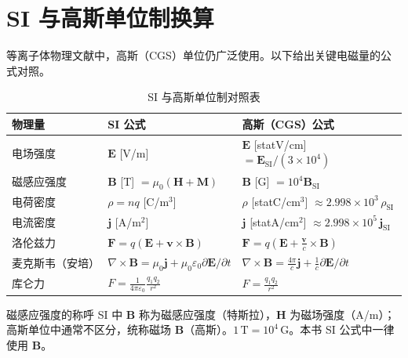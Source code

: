 \documentclass[12pt,a4paper,openany,oneside]{book}
\newcommand{\eps}{\varepsilon}
\newcommand{\vect}[1]{\bm{#1}}
\newcommand{\curl}{\nabla\times}
\begin{document}
\section{SI 与高斯单位制换算}

等离子体物理文献中，高斯（CGS）单位仍广泛使用。以下给出关键电磁量的公式对照。

\begin{table}[htbp]
\centering
\caption{SI 与高斯单位制对照表}
\label{tab:unit-conversion}
\begin{tabular}{@{}p{3.5cm}p{5.5cm}p{5.5cm}@{}}
\toprule
\textbf{物理量} & \textbf{SI 公式} & \textbf{高斯（CGS）公式} \\
\midrule
电场强度 & $\vect{E}$ [V/m] & $\vect{E}$ [statV/cm] $= \vect{E}_\text{SI}/(3\times 10^4)$ \\
磁感应强度 & $\vect{B}$ [T] $=\mu_0(\vect{H}+\vect{M})$ & $\vect{B}$ [G] $= 10^4\vect{B}_\text{SI}$ \\
电荷密度 & $\rho = nq$ [C/m$^3$] & $\rho$ [statC/cm$^3$] $\approx 2.998\times 10^{3}\,\rho_\text{SI}$ \\
电流密度 & $\vect{j}$ [A/m$^2$] & $\vect{j}$ [statA/cm$^2$] $\approx 2.998\times 10^{5}\,\vect{j}_\text{SI}$ \\
洛伦兹力 & $\vect{F}=q(\vect{E}+\vect{v}\times\vect{B})$ & $\vect{F}=q\left(\vect{E}+\frac{\vect{v}}{c}\times\vect{B}\right)$ \\
麦克斯韦（安培） & $\curl\vect{B}=\mu_0\vect{j}+\mu_0\eps_0\partial\vect{E}/\partial t$ & $\curl\vect{B}=\frac{4\pi}{c}\vect{j}+\frac{1}{c}\partial\vect{E}/\partial t$ \\
库仑力 & $F=\frac{1}{4\pi\eps_0}\frac{q_1q_2}{r^2}$ & $F=\frac{q_1q_2}{r^2}$ \\
\bottomrule
\end{tabular}
\end{table}

\begin{warning}{磁感应强度的称呼}{}
SI 中 $\vect{B}$ 称为磁感应强度（特斯拉），$\vect{H}$ 为磁场强度（A/m）；高斯单位中通常不区分，统称磁场 $\vect{B}$（高斯）。$1\,\text{T} = 10^4\,\text{G}$。本书 SI 公式中一律使用 $\vect{B}$。
\end{warning}
\end{document}
